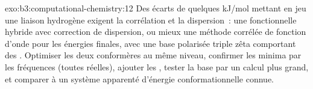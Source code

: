 \begin{solution}{exo:b3:computational-chemistry:12}
Des écarts de quelques \unit{kJ/mol} mettant en jeu une liaison hydrogène
exigent la corrélation et la dispersion~: une fonctionnelle hybride avec
correction de dispersion, ou mieux une méthode corrélée de fonction
d'onde pour les énergies finales, avec une base polarisée triple zêta
comportant des . Optimiser les deux conformères au même
niveau, confirmer les minima par les fréquences (toutes réelles), ajouter
les , tester la base par un calcul plus grand, et
comparer à un système apparenté d'énergie conformationnelle connue.
\end{solution}

